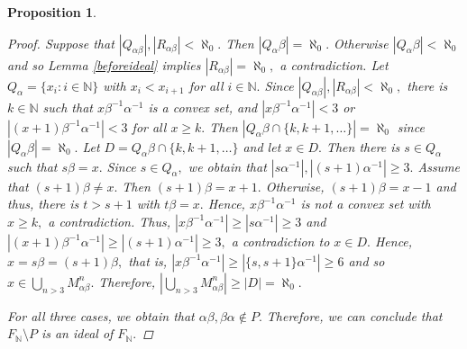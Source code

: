 \documentclass[11pt]{article}
\theoremstyle{plain}
\newtheorem{proposition}[theorem]{Proposition}
\theoremstyle{definition}
\begin{document}
\begin{proposition}
\begin{proof}
Suppose that $\left\vert Q_{\alpha\beta}\right\vert,\left\vert R_{\alpha\beta}\right\vert<\aleph_{0}.$ Then $\left\vert Q_{\alpha}\beta\right\vert=\aleph_{0}.$ Otherwise $\left\vert Q_{\alpha}\beta\right\vert<\aleph_{0}$ and so Lemma \ref{beforeideal} implies $\left\vert R_{\alpha\beta}\right\vert=\aleph_{0},$ a contradiction. Let $Q_{\alpha}=\{x_{i}:i\in\mathbb{N}\}$ with $x_{i}<x_{i+1}$ for all $i\in\mathbb{N}.$ Since $\left\vert Q_{\alpha\beta}\right\vert,\left\vert R_{\alpha\beta}\right\vert<\aleph_{0},$ there is $k\in\mathbb{N}$ such that $x\beta^{-1}\alpha^{-1}$ is a convex set, and $\left\vert x\beta^{-1}\alpha^{-1}\right\vert<3$ or $\left\vert (x+1)\beta^{-1}\alpha^{-1}\right\vert<3$ for all $x\geq k.$ Then $\left\vert Q_{\alpha}\beta\cap\{k,k+1,\ldots\}\right\vert=\aleph_{0}$ since $\left\vert Q_{\alpha}\beta\right\vert=\aleph_{0}.$ Let $D=Q_{\alpha}\beta\cap\{k,k+1,\ldots\}$ and let $x\in D.$ Then there is $s\in Q_{\alpha}$ such that $s\beta=x.$ Since $s\in Q_{\alpha},$ we obtain that $\left\vert s\alpha^{-1}\right\vert,\left\vert (s+1)\alpha^{-1}\right\vert\geq 3.$ Assume that $(s+1)\beta\not=x.$ Then $(s+1)\beta=x+1.$ Otherwise, $(s+1)\beta=x-1$ and thus, there is $t>s+1$ with $t\beta=x.$ Hence, $x\beta^{-1}\alpha^{-1}$ is not a convex set with $x\geq k,$ a contradiction. Thus, $\left\vert x\beta^{-1}\alpha^{-1}\right\vert\geq\left\vert s\alpha^{-1}\right\vert\geq 3$ and $\left\vert (x+1)\beta^{-1}\alpha^{-1}\right\vert\geq\left\vert (s+1)\alpha^{-1}\right\vert\geq 3,$ a contradiction to $x\in D.$ Hence, $x=s\beta=(s+1)\beta,$ that is, $\left\vert x\beta^{-1}\alpha^{-1}\right\vert\geq\left\vert\{s,s+1\}\alpha^{-1}\right\vert\geq 6$ and so $x\in\bigcup_{n>3}M^{n}_{\alpha\beta}.$ Therefore, $\left\vert\bigcup_{n>3}M^{n}_{\alpha\beta}\right\vert\geq\left\vert D\right\vert=\aleph_{0}.$

For all three cases, we obtain that $\alpha\beta,\beta\alpha\not\in P.$ Therefore, we can conclude that $F_{\mathbb{N}}\setminus P$ is an ideal of $F_{\mathbb{N}}.$

\end{proof}
\end{proposition}
\end{document}
